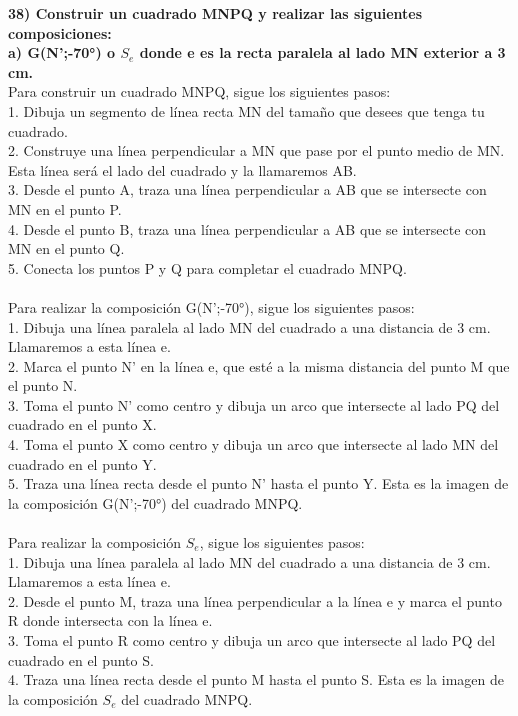\documentclass{article}
\begin{document}
{\bf 38)  Construir un cuadrado MNPQ y realizar las siguientes composiciones: } \\
{\bf a) G(N’;-70°) o $S_e$ donde e es la recta paralela al lado MN exterior a 3 cm. }  \\
Para construir un cuadrado MNPQ, sigue los siguientes pasos:\\
1. Dibuja un segmento de línea recta MN del tamaño que desees que tenga tu cuadrado.\\
2. Construye una línea perpendicular a MN que pase por el punto medio de MN. Esta línea será el lado del cuadrado y la llamaremos AB.\\
3. Desde el punto A, traza una línea perpendicular a AB que se intersecte con MN en el punto P.\\
4. Desde el punto B, traza una línea perpendicular a AB que se intersecte con MN en el punto Q.\\
5. Conecta los puntos P y Q para completar el cuadrado MNPQ.\\
\\
Para realizar la composición G(N’;-70°), sigue los siguientes pasos:\\
1. Dibuja una línea paralela al lado MN del cuadrado a una distancia de 3 cm. Llamaremos a esta línea e.\\
2. Marca el punto N' en la línea e, que esté a la misma distancia del punto M que el punto N.\\
3. Toma el punto N' como centro y dibuja un arco que intersecte al lado PQ del cuadrado en el punto X.\\
4. Toma el punto X como centro y dibuja un arco que intersecte al lado MN del cuadrado en el punto Y.\\
5. Traza una línea recta desde el punto N' hasta el punto Y. Esta es la imagen de la composición G(N’;-70°) del cuadrado MNPQ.\\
\\
Para realizar la composición $S_e$, sigue los siguientes pasos:\\
1. Dibuja una línea paralela al lado MN del cuadrado a una distancia de 3 cm. Llamaremos a esta línea e.\\
2. Desde el punto M, traza una línea perpendicular a la línea e y marca el punto R donde intersecta con la línea e.\\
3. Toma el punto R como centro y dibuja un arco que intersecte al lado PQ del cuadrado en el punto S.\\
4. Traza una línea recta desde el punto M hasta el punto S. Esta es la imagen de la composición $S_e$ del cuadrado MNPQ.\\
\end{document}
